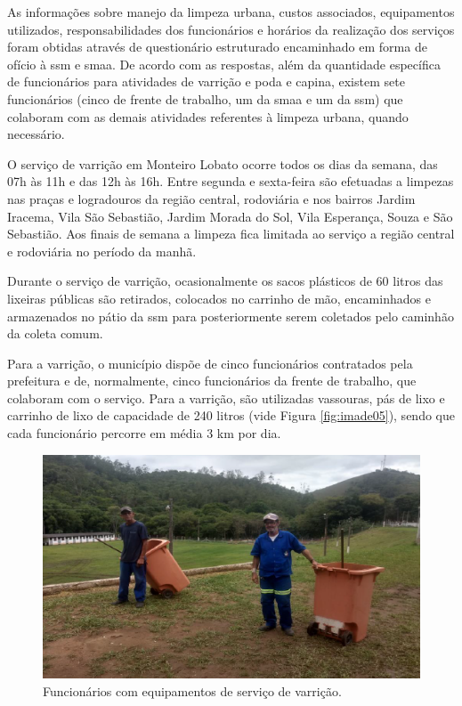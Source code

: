 	As informações sobre manejo da limpeza urbana, custos associados, equipamentos utilizados, responsabilidades dos funcionários e horários da realização dos serviços foram obtidas através de questionário estruturado encaminhado em forma de ofício à \gls{ssm} e \gls{smaa}. De acordo com as respostas, além da quantidade específica de funcionários para atividades de varrição e poda e capina, existem sete funcionários (cinco de frente de trabalho, um da \gls{smaa} e um da \gls{ssm}) que colaboram com as demais atividades referentes à limpeza urbana, quando necessário.
	
	O serviço de varrição em Monteiro Lobato ocorre todos os dias da semana, das 07h às 11h e das 12h às 16h. Entre segunda e sexta-feira são efetuadas a limpezas nas praças e logradouros da região central, rodoviária e nos bairros Jardim Iracema, Vila São Sebastião, Jardim Morada do Sol, Vila Esperança, Souza e São Sebastião. Aos finais de semana a limpeza fica limitada ao serviço a região central e rodoviária no período da manhã.
	
	Durante o serviço de varrição, ocasionalmente os sacos plásticos de 60 litros das lixeiras públicas são retirados, colocados no carrinho de mão, encaminhados e armazenados no pátio da \gls{ssm} para posteriormente serem coletados pelo caminhão da coleta comum.
	

	Para a varrição, o município dispõe de cinco funcionários contratados pela prefeitura e de, normalmente, cinco funcionários da frente de trabalho, que colaboram com o serviço. Para a varrição, são utilizadas vassouras, pás de lixo e carrinho de lixo de capacidade de 240 litros (vide Figura \ref{fig:imade05}), sendo que cada funcionário percorre em média 3 km por dia.

	\begin{figure}
		\centering
		\includegraphics[width=0.7\linewidth]{produtos/prodtres/image051}
		\caption{Funcionários com equipamentos de serviço de varrição.}
		\label{fig:image051}
	\end{figure}
	

